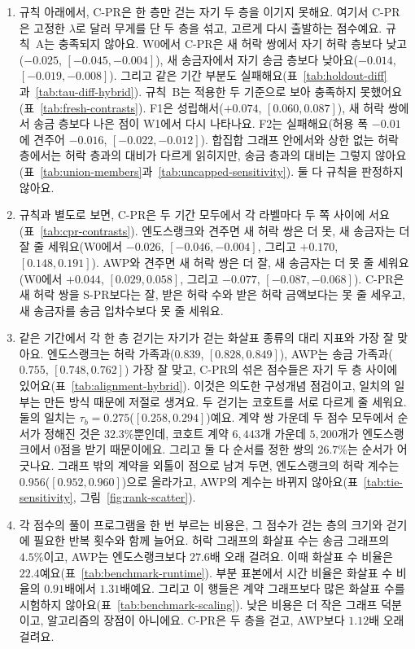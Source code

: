 \begin{enumerate}
\item[C3.] 규칙 아래에서, \mbox{C-PR}은 한 층만 걷는 자기 두 층을 이기지 못해요. 여기서 \mbox{C-PR}은 고정한 $\lambda$로 달러 무게를 단 두 층을 섞고, 고르게 다시 출발하는 점수예요. 규칙~A는 충족되지 않아요. W0에서 \mbox{C-PR}은 새 허락 쌍에서 자기 허락 층보다 낮고($-0.025$, $[-0.045,-0.004]$), 새 송금자에서 자기 송금 층보다 낮아요($-0.014$, $[-0.019,-0.008]$). 그리고 같은 기간 부분도 실패해요(표~\ref{tab:holdout-diff}과~\ref{tab:tau-diff-hybrid}). 규칙~B는 적용한 두 기준으로 보아 충족하지 못했어요(표~\ref{tab:fresh-contrasts}). F1은 성립해서($+0.074$, $[0.060,0.087]$), 새 허락 쌍에서 송금 층보다 나은 점이 W1에서 다시 나타나요. F2는 실패해요(허용 폭 $-0.01$에 견주어 $-0.016$, $[-0.022,-0.012]$). 합집합 그래프 안에서와 상한 없는 허락 층에서는 허락 층과의 대비가 다르게 읽히지만, 송금 층과의 대비는 그렇지 않아요(표~\ref{tab:union-members}과~\ref{tab:uncapped-sensitivity}). 둘 다 규칙을 판정하지 않아요.
\item[C4.] 규칙과 별도로 보면, \mbox{C-PR}은 두 기간 모두에서 각 라벨마다 두 쪽 사이에 서요(표~\ref{tab:cpr-contrasts}). 엔도스랭크와 견주면 새 허락 쌍은 더 못, 새 송금자는 더 잘 줄 세워요(W0에서 $-0.026$, $[-0.046,-0.004]$, 그리고 $+0.170$, $[0.148,0.191]$). AWP와 견주면 새 허락 쌍은 더 잘, 새 송금자는 더 못 줄 세워요(W0에서 $+0.044$, $[0.029,0.058]$, 그리고 $-0.077$, $[-0.087,-0.068]$). \mbox{C-PR}은 새 허락 쌍을 \mbox{S-PR}보다는 잘, 받은 허락 수와 받은 허락 금액보다는 못 줄 세우고, 새 송금자를 송금 입차수보다 못 줄 세워요.
\item[C5.] 같은 기간에서 각 한 층 걷기는 자기가 걷는 화살표 종류의 대리 지표와 가장 잘 맞아요. 엔도스랭크는 허락 가족과($0.839$, $[0.828,0.849]$), AWP는 송금 가족과($0.755$, $[0.748,0.762]$) 가장 잘 맞고, \mbox{C-PR}의 섞은 점수들은 자기 두 층 사이에 있어요(표~\ref{tab:alignment-hybrid}). 이것은 의도한 구성개념 점검이고, 일치의 일부는 만든 방식 때문에 저절로 생겨요. 두 걷기는 코호트를 서로 다르게 줄 세워요. 둘의 일치는 $\tau_b=0.275$($[0.258,0.294]$)예요. 계약 쌍 가운데 두 점수 모두에서 순서가 정해진 것은 $32.3\%$뿐인데, 코호트 계약 $6{,}443$개 가운데 $5{,}200$개가 엔도스랭크에서 0점을 받기 때문이에요. 그리고 둘 다 순서를 정한 쌍의 $26.7\%$는 순서가 어긋나요. 그래프 밖의 계약을 외톨이 점으로 남겨 두면, 엔도스랭크의 허락 계수는 $0.956$($[0.952,0.960]$)으로 올라가고, AWP의 계수는 바뀌지 않아요(표~\ref{tab:tie-sensitivity}, 그림~\ref{fig:rank-scatter}).
\item[C6.] 각 점수의 풀이 프로그램을 한 번 부르는 비용은, 그 점수가 걷는 층의 크기와 걷기에 필요한 반복 횟수와 함께 늘어요. 허락 그래프의 화살표 수는 송금 그래프의 $4.5\%$이고, AWP는 엔도스랭크보다 $27.6$배 오래 걸려요. 이때 화살표 수 비율은 $22.4$예요(표~\ref{tab:benchmark-runtime}). 부분 표본에서 시간 비율은 화살표 수 비율의 $0.91$배에서 $1.31$배예요. 그리고 이 행들은 계약 그래프보다 많은 화살표 수를 시험하지 않아요(표~\ref{tab:benchmark-scaling}). 낮은 비용은 더 작은 그래프 덕분이고, 알고리즘의 장점이 아니에요. \mbox{C-PR}은 두 층을 걷고, AWP보다 $1.12$배 오래 걸려요.
\end{enumerate}
